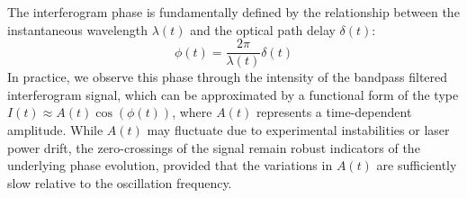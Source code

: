 \documentclass[12pt]{report}
\begin{document}
	The interferogram phase is fundamentally defined by the relationship between the instantaneous wavelength $\lambda(t)$ and the optical path delay $\delta(t)$:
	\begin{equation}
		\phi(t) = \frac{2\pi}{\lambda (t)} \delta(t)
	\end{equation}
	In practice, we observe this phase through the intensity of the bandpass filtered interferogram signal, which can be approximated by a functional form of the type $I(t) \approx A(t) \cos(\phi(t)) $, where $A(t)$ represents a time-dependent amplitude. While $A(t)$ may fluctuate due to experimental instabilities or laser power drift, the zero-crossings of the signal remain robust indicators of the underlying phase evolution, provided that the variations in $A(t)$ are sufficiently slow relative to the oscillation frequency.
	
\end{document}
